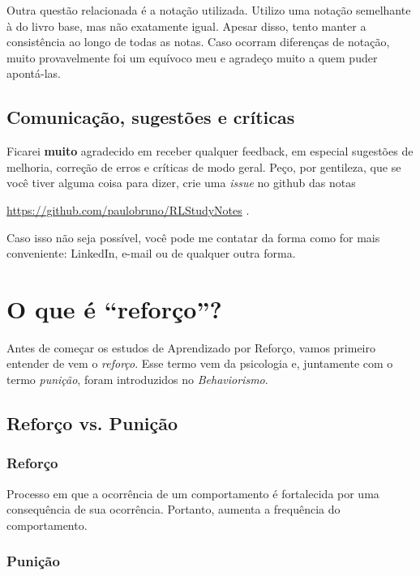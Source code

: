 \documentclass{article}
\begin{document}
            Outra questão relacionada é a notação utilizada. Utilizo uma notação semelhante à do livro base, mas não exatamente igual. Apesar disso, tento manter a consistência ao longo de todas as notas. Caso ocorram diferenças de notação, muito provavelmente foi um equívoco meu e agradeço muito a quem puder apontá-las.
            
        \subsection{Comunicação, sugestões e críticas}
            
            Ficarei \textbf{muito} agradecido em receber qualquer feedback, em especial sugestões de melhoria, correção de erros e críticas de modo geral. Peço, por gentileza, que se você tiver alguma coisa para dizer, crie uma \emph{issue} no github das notas
            \begin{center}
                \url{https://github.com/paulobruno/RLStudyNotes} .
            \end{center}
            Caso isso não seja possível, você pode me contatar da forma como for mais conveniente: LinkedIn, e-mail ou de qualquer outra forma.
            
    \section{O que é ``reforço''?}
    
        Antes de começar os estudos de Aprendizado por Reforço, vamos primeiro entender de vem o \emph{reforço}. Esse termo vem da psicologia e, juntamente com o termo \emph{punição}, foram introduzidos no \emph{Behaviorismo}.
    
        \subsection{Reforço vs. Punição}
        
            \subsubsection{Reforço}
            
                Processo em que a ocorrência de um comportamento é fortalecida por uma consequência de sua ocorrência. Portanto, aumenta a frequência do comportamento.
            
            \subsubsection{Punição}
            
\end{document}
